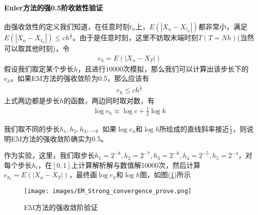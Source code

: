             \paragraph{Euler方法的强0.5阶收敛性验证}
            由强收敛性的定义我们知道，在任意时刻$t_n$上，$E(|X_n - X_{t_n}|)$都非常小，满足$E(|X_n - X_{t_n}|) \leqslant ch^\frac{1}{2}$。由于是任意时刻，这里不妨取末端时刻$T(T = Nh)$(当然可以取其他时刻)，令
            \begin{align*}
            e_h = E(|X_n - X_{T}|)
            \end{align*}
            假设我们取定某个步长$h$，且进行$10000$次模拟，那么我们可以计算出该步长下的$e_h$。如果EM方法的强收敛阶为0.5，那么应该有
            \begin{align*}
            e_h \leqslant ch^\frac{1}{2}
            \end{align*}
            上式两边都是步长$h$的函数，两边同时取对数，有
            \begin{align*}
            \log e_h \approx \log c + \frac 12 \log h
            \end{align*}
            \par
            我们取不同的步长$h_1,h_2,h_3,\dots$。如果$\log e_h$和$\log h$所绘成的直线斜率接近$\frac 12$，则说明EM方法的强收敛阶确实为0.5。
            \par
            作为实验，这里，我们取步长$h_1 = 2^{-8},h_2 = 2^{-7},h_3 = 2^{-6},h_4 = 2^{-5},h_5 = 2^{-4}$，对每个步长$h_i$，在$[0,1]$上计算解析解与数值解10000次，然后计算$e_{h_i} = E(|X_n - X_T|) $，最终画$\log e_h$和$\log h$图，如图(\ref{fig:EM方法的强收敛阶验证})所示
           \begin{figure}[H]
           \centering
           \texttt{[image: images/EM\_Strong\_convergence\_prove.png]}
           \caption{EM方法的强收敛阶验证}
           \label{fig:EM方法的强收敛阶验证}
           \end{figure}

